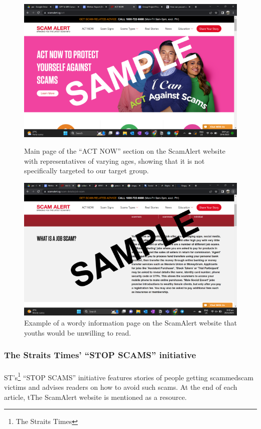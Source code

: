 \documentclass[a4paper]{article}
\begin{document}
\begin{figure}[ht]
   \centering
  \includegraphics[width=\textwidth]{scamalert}
  \caption{Main page of the ``ACT NOW'' section on the ScamAlert website with
    representatives of varying ages, showing that it is not specifically
    targeted to our target group.}\label{fig:scamalert}
  \endminipage\hfill {} \centering
  \includegraphics[width=\textwidth]{scamalertwordy}
  \caption{Example of a wordy information page on the ScamAlert website that
    youths would be unwilling to read.}\label{fig:scamalertwordy}
  \endminipage{}
\end{figure}

\subsubsection{The Straits Times' ``STOP SCAMS'' initiative}
\paragraph{} ST's\footnote{The Straits Times} ``STOP SCAMS'' initiative features
stories of people getting scammedscam victims and advises readers on how to
avoid such scams. At the end of each article, tThe ScamAlert website is
mentioned as a resource.
\end{document}

